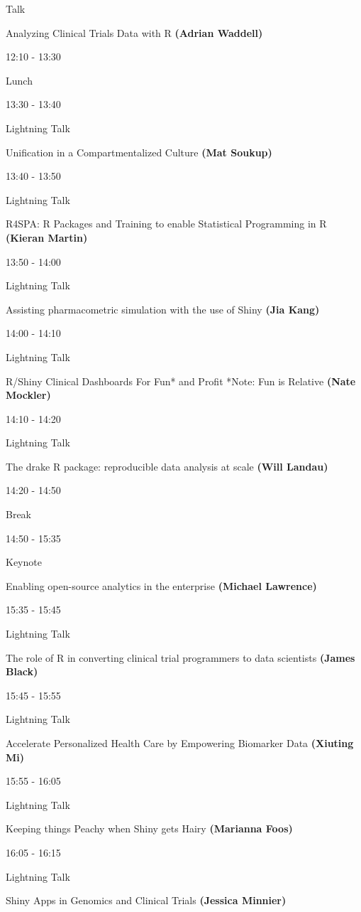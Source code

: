 \documentclass[]{book}
\theoremstyle{definition}
\theoremstyle{definition}
\theoremstyle{definition}
\theoremstyle{remark}
\begin{document}
Talk

Analyzing Clinical Trials Data with R \textbf{(Adrian Waddell)}

12:10 - 13:30

Lunch

13:30 - 13:40

Lightning Talk

Unification in a Compartmentalized Culture \textbf{(Mat Soukup)}

13:40 - 13:50

Lightning Talk

R4SPA: R Packages and Training to enable Statistical Programming in R
\textbf{(Kieran Martin)}

13:50 - 14:00

Lightning Talk

Assisting pharmacometric simulation with the use of Shiny \textbf{(Jia
Kang)}

14:00 - 14:10

Lightning Talk

R/Shiny Clinical Dashboards For Fun* and Profit *Note: Fun is Relative
\textbf{(Nate Mockler)}

14:10 - 14:20

Lightning Talk

The drake R package: reproducible data analysis at scale \textbf{(Will
Landau)}

14:20 - 14:50

Break

14:50 - 15:35

Keynote

Enabling open-source analytics in the enterprise \textbf{(Michael
Lawrence)}

15:35 - 15:45

Lightning Talk

The role of R in converting clinical trial programmers to data
scientists \textbf{(James Black)}

15:45 - 15:55

Lightning Talk

Accelerate Personalized Health Care by Empowering Biomarker Data
\textbf{(Xiuting Mi)}

15:55 - 16:05

Lightning Talk

Keeping things Peachy when Shiny gets Hairy \textbf{(Marianna Foos)}

16:05 - 16:15

Lightning Talk

Shiny Apps in Genomics and Clinical Trials \textbf{(Jessica Minnier)}
\end{document}
